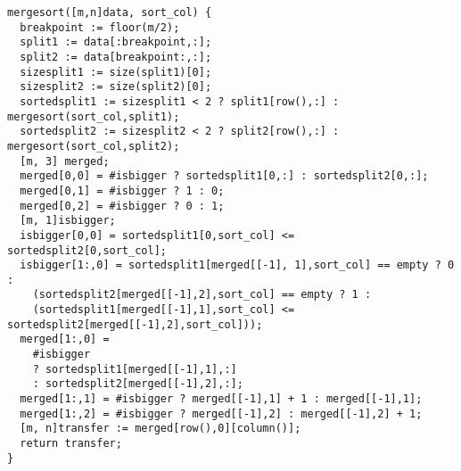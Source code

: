 \begin{lstlisting}
mergesort([m,n]data, sort_col) {
  breakpoint := floor(m/2);
  split1 := data[:breakpoint,:];
  split2 := data[breakpoint:,:];
  sizesplit1 := size(split1)[0];
  sizesplit2 := size(split2)[0];
  sortedsplit1 := sizesplit1 < 2 ? split1[row(),:] : mergesort(sort_col,split1);
  sortedsplit2 := sizesplit2 < 2 ? split2[row(),:] : mergesort(sort_col,split2);
  [m, 3] merged;
  merged[0,0] = #isbigger ? sortedsplit1[0,:] : sortedsplit2[0,:];
  merged[0,1] = #isbigger ? 1 : 0;
  merged[0,2] = #isbigger ? 0 : 1;
  [m, 1]isbigger;
  isbigger[0,0] = sortedsplit1[0,sort_col] <= sortedsplit2[0,sort_col];
  isbigger[1:,0] = sortedsplit1[merged[[-1], 1],sort_col] == empty ? 0 :
    (sortedsplit2[merged[[-1],2],sort_col] == empty ? 1 :
    (sortedsplit1[merged[[-1],1],sort_col] <= sortedsplit2[merged[[-1],2],sort_col]));
  merged[1:,0] =
    #isbigger
    ? sortedsplit1[merged[[-1],1],:]
    : sortedsplit2[merged[[-1],2],:];
  merged[1:,1] = #isbigger ? merged[[-1],1] + 1 : merged[[-1],1];
  merged[1:,2] = #isbigger ? merged[[-1],2] : merged[[-1],2] + 1;
  [m, n]transfer := merged[row(),0][column()];
  return transfer;
}
\end{lstlisting}
